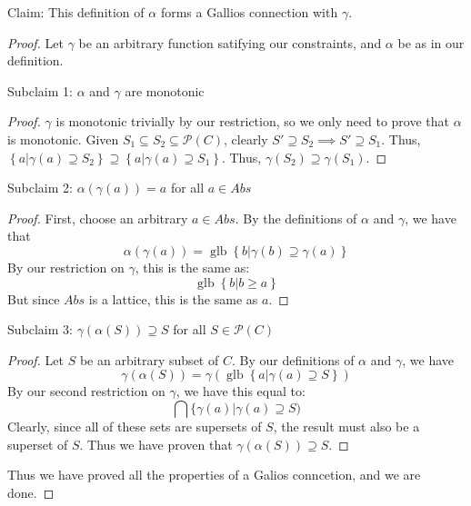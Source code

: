 \documentclass{article}
\newcommand{\powerset}{\mathcal{P}}
\newcommand{\glb}{\operatorname{glb}}
\begin{document}
Claim: This definition of $\alpha$ forms a Gallios connection with $\gamma$.
\begin{proof}
Let $\gamma$ be an arbitrary function satifying our constraints, and $\alpha$
be as in our definition.

Subclaim 1: $\alpha$ and $\gamma$ are monotonic
\begin{proof}
$\gamma$ is monotonic trivially by our restriction, so we only need to prove
that $\alpha$ is monotonic.
Given $S_1 \subseteq S_2 \subseteq \powerset(C)$, clearly
$S' \supseteq S_2 \implies S' \supseteq S_1$.
Thus, 
$
\left\{ a | \gamma(a) \supseteq S_2 \right\} \supseteq \left\{ a | \gamma(a)
\supseteq S_1 \right\}.
$
 Thus,
$\gamma(S_2) \supseteq \gamma(S_1)$.
\end{proof}

Subclaim 2: $\alpha(\gamma(a)) = a$ for all $a \in Abs$
\begin{proof}
First, choose an arbitrary $a \in Abs$.
By the definitions of $\alpha$ and $\gamma$, we have that
\[
\alpha(\gamma(a)) = \glb \left\{ b | \gamma(b) \supseteq \gamma(a) \right\}
\]
By our restriction on $\gamma$, this is the same as:
\[
\glb \left\{ b | b \ge a \right\}
\]
But since $Abs$ is a lattice, this is the same as $a$.
\end{proof}

Subclaim 3: $\gamma(\alpha(S)) \supseteq S$ for all $S \in \powerset(C)$
\begin{proof}
Let $S$ be an arbitrary subset of $C$.
By our definitions of $\alpha$ and $\gamma$, we have
\[
\gamma(\alpha(S)) =  \gamma( \glb \left\{ a | \gamma(a) \supseteq S \right\} )
\]
By our second restriction on $\gamma$, we have this equal to:
\[
\bigcap \{ \gamma(a) | \gamma(a) \supseteq S)
\]
Clearly, since all of these sets are supersets of $S$, the result must also be
a superset of $S$.
Thus we have proven that $\gamma(\alpha(S)) \supseteq S$.
\end{proof}

Thus we have proved all the properties of a Galios conncetion, and we are done.
\end{proof}
\end{document}
